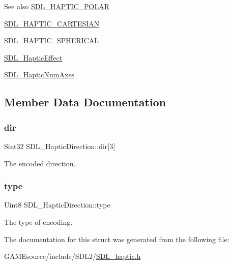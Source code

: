 \begin{DoxySeeAlso}{See also}
\mbox{\hyperlink{_s_d_l__haptic_8h_acdc35e97e5525472054a67b76e518f3b}{S\+D\+L\+\_\+\+H\+A\+P\+T\+I\+C\+\_\+\+P\+O\+L\+AR}} 

\mbox{\hyperlink{_s_d_l__haptic_8h_af8b2430a363a968de2a5b64c8f663d3b}{S\+D\+L\+\_\+\+H\+A\+P\+T\+I\+C\+\_\+\+C\+A\+R\+T\+E\+S\+I\+AN}} 

\mbox{\hyperlink{_s_d_l__haptic_8h_a1fcf7cb0eaf3c39b16ba266054e25aff}{S\+D\+L\+\_\+\+H\+A\+P\+T\+I\+C\+\_\+\+S\+P\+H\+E\+R\+I\+C\+AL}} 

\mbox{\hyperlink{union_s_d_l___haptic_effect}{S\+D\+L\+\_\+\+Haptic\+Effect}} 

\mbox{\hyperlink{_s_d_l__haptic_8h_ad6705645197f6df4eeeea32392462483}{S\+D\+L\+\_\+\+Haptic\+Num\+Axes}} 
\end{DoxySeeAlso}


\subsection{Member Data Documentation}
\mbox{\label{struct_s_d_l___haptic_direction_a6cebd8118a3e61e36bd0c503ae020362}} 
\subsubsection{\texorpdfstring{dir}{dir}}
{\footnotesize\ttfamily Sint32 S\+D\+L\+\_\+\+Haptic\+Direction\+::dir\mbox{[}3\mbox{]}}

The encoded direction. \mbox{\label{struct_s_d_l___haptic_direction_acd6830ad68c4ba2af16057fa418087cc}} 
\subsubsection{\texorpdfstring{type}{type}}
{\footnotesize\ttfamily Uint8 S\+D\+L\+\_\+\+Haptic\+Direction\+::type}

The type of encoding. 

The documentation for this struct was generated from the following file\+:\begin{DoxyCompactItemize}
\item 
G\+A\+M\+Esource/include/\+S\+D\+L2/\mbox{\hyperlink{_s_d_l__haptic_8h}{S\+D\+L\+\_\+haptic.\+h}}\end{DoxyCompactItemize}
